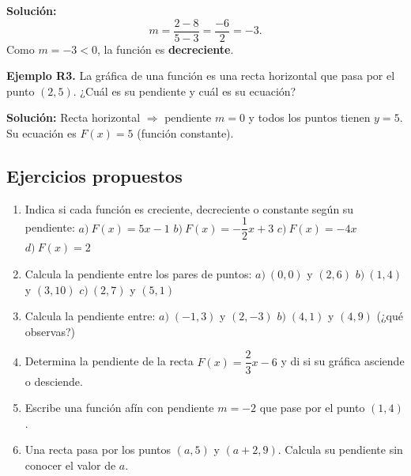 \documentclass[12pt, letterpaper]{article}
\begin{document}
\begin{cuadrosolucion}
  \textbf{Solución:}
  $$m = \frac{2 - 8}{5 - 3} = \frac{-6}{2} = -3.$$
  Como $m = -3 < 0$, la función es \textbf{decreciente}.
\end{cuadrosolucion}

\textbf{Ejemplo R3.} La gráfica de una función es una recta horizontal que pasa por el punto $(2, 5)$. ¿Cuál es su pendiente y cuál es su ecuación?

\begin{cuadrosolucion}
  \textbf{Solución:} Recta horizontal $\Rightarrow$ pendiente $m = 0$ y todos los puntos tienen $y = 5$. Su ecuación es $F(x) = 5$ (función constante).
\end{cuadrosolucion}

\subsection{Ejercicios propuestos}

\begin{enumerate}[leftmargin=*, resume]
  \item \facil{} Indica si cada función es creciente, decreciente o constante según su pendiente: $a)\ F(x) = 5x - 1$ \quad $b)\ F(x) = -\dfrac{1}{2}x + 3$ \quad $c)\ F(x) = -4x$ \quad $d)\ F(x) = 2$

  \item \facil{} Calcula la pendiente entre los pares de puntos: $a)\ (0, 0)$ y $(2, 6)$ \enskip $b)\ (1, 4)$ y $(3, 10)$ \enskip $c)\ (2, 7)$ y $(5, 1)$

  \item \medio{} Calcula la pendiente entre: $a) \; (-1, 3)$ y $(2, -3)$ \quad $b) \; (4, 1)$ y $(4, 9)$ (¿qué observas?)

  \item \medio{} Determina la pendiente de la recta $F(x) = \dfrac{2}{3}x - 6$ y di si su gráfica asciende o desciende.

  \item \dificil{} Escribe una función afín con pendiente $m = -2$ que pase por el punto $(1, 4)$.

  \item \dificil{} Una recta pasa por los puntos $(a, 5)$ y $(a + 2, 9)$. Calcula su pendiente sin conocer el valor de $a$.
\end{enumerate}

\newpage %

\end{document}
